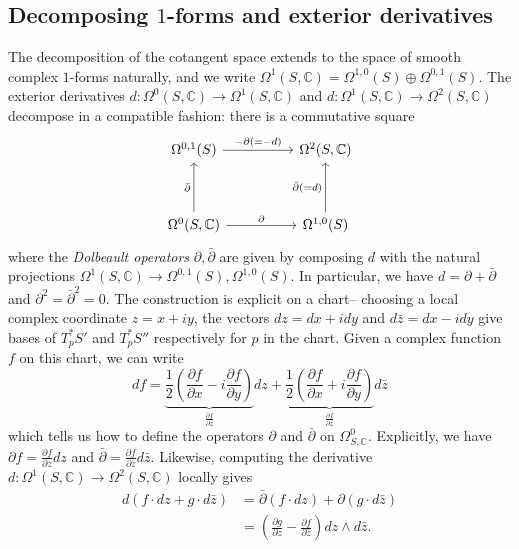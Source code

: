 \subsection{Decomposing \(1\)-forms and exterior derivatives} The decomposition
of the cotangent space extends to the space of smooth complex \(1\)-forms naturally,
and we write \(\Omega^1(S,\mathbb{C})=\Omega^{1,0}(S)\oplus \Omega^{0,1}(S)\).
The exterior derivatives \(d:\Omega^0(S,\mathbb{C})\to
\Omega^1(S,\mathbb{C})\) and \(d: \Omega^1(S,\mathbb{C})\to
\Omega^2(S,\mathbb{C})\) decompose in a compatible fashion: there is a
commutative square
\[ \begin{tikzcd}[row sep=huge, column sep=huge]
        \Omega^{0,1}(S) \rar{-\partial (=-d)} & \Omega^2(S,\mathbb{C}) \\
        \Omega^0(S,\mathbb{C})\uar{\bar\partial} \rar{\partial} &
        \Omega^{1,0}(S)\uar{\bar\partial (=d)}
    \end{tikzcd}\]
where the \textit{Dolbeault operators} \(\partial, \bar\partial\) are given by
composing \(d\) with the natural projections \(\Omega^1(S,\mathbb{C})\to
\Omega^{0,1}(S), \Omega^{1,0}(S)\). In particular, we have \(d=\partial
+\bar\partial\) and \(\partial^2=\bar\partial^2=0\). The construction is explicit on a chart--
choosing a local complex coordinate \(z=x+iy\), the vectors \(dz=dx+idy\) and \(d\bar z= dx-idy\) give bases of \(T_p^\ast S'\) and \(T_p^\ast
S''\) respectively for \(p\) in the chart. Given a complex function \(f\) on this chart, we can write
\[
    df = \underbrace{\frac{1}{2}\left( \frac{\partial f}{\partial
       x}-i\frac{\partial f}{\partial y}\right)}_{\frac{\partial
       f}{\partial z}}dz +
       \underbrace{\frac{1}{2}\left( \frac{\partial f}{\partial
       x}+i\frac{\partial f}{\partial y}\right)}_{\frac{\partial
       f}{\partial \bar z}}d\bar z
\]
which tells us how to define the operators \(\partial\) and \(\bar\partial
\) on \(\Omega^0_{S,\mathbb{C}}\). Explicitly, we have \(\partial f =
\frac{\partial f}{\partial z}dz\) and \(\bar\partial = \frac{\partial f
}{\partial \bar z}d\bar z\). Likewise, computing the derivative
\(d:\Omega^1(S,\mathbb{C})\to \Omega^2(S,\mathbb{C})\) locally gives
\begin{align*}
    d(f\cdot dz +g\cdot d\bar z)&=\bar\partial(f\cdot dz)+\partial(g\cdot d\bar
    z)\\ &= \left(\frac{\partial g}{\partial z}-\frac{\partial f}{\partial \bar
    z}\right)dz\wedge d\bar z.
\end{align*}


